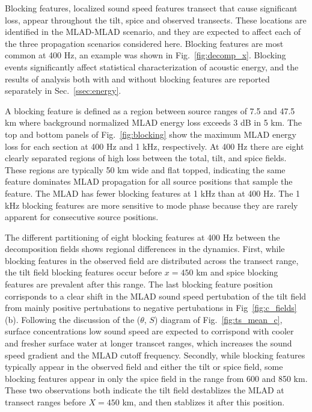 \documentclass[preprint,NumberedRefs]{JASA}
\begin{document}
Blocking features, localized sound speed features transect that cause significant loss, appear throughout the tilt, spice and observed transects. These locations are identified in the MLAD-MLAD scenario, and they are expected to affect each of the three propagation scenarios considered here. Blocking features are most common at 400 Hz, an example was shown in Fig.~\ref{fig:decomp_x}. Blocking events significantly affect statistical characterization of acoustic energy, and the results of analysis both with and without blocking features are reported separately in Sec.~\ref{ssec:energy}.

A blocking feature is defined as a region between source ranges of 7.5 and 47.5 km where background normalized MLAD energy loss exceeds 3 dB in 5 km. The top and bottom panels of Fig.~\ref{fig:blocking} show the maximum MLAD energy loss for each section at 400 Hz and 1 kHz, respectively. At 400 Hz there are eight clearly separated regions of high loss between the total, tilt, and spice fields. These regions are typically 50 km wide and flat topped, indicating the same feature dominates MLAD propagation for all source positions that sample the feature. The MLAD has fewer blocking features at 1 kHz than at 400 Hz. The 1 kHz blocking features are more sensitive to mode phase because they are rarely apparent for consecutive source positions.

The different partitioning of eight blocking features at 400 Hz between the decomposition fields shows regional differences in the dynamics. First, while blocking features in the observed field are distributed across the transect range, the tilt field blocking features occur before $x=450$ km and spice blocking features are prevalent after this range. The last blocking feature position corrisponds to a clear shift in the MLAD sound speed pertubation of the tilt field from mainly positive pertubations to negative pertubations in Fig~\ref{fig:c_fields}(b). Following the discussion of the ($\theta$, $S$) diagram of Fig.~\ref{fig:ts_mean_c}, surface concentrations low sound speed are expected to corrispond with cooler and fresher surface water at longer transcet ranges, which increases the sound speed gradient and the MLAD cutoff frequency. Secondly, while blocking features typically appear in the observed field and either the tilt or spice field, some blocking features appear in only the spice field in the range from 600 and 850 km. These two observations both indicate the tilt field destablizes the MLAD at transect ranges before $X=450$ km, and then stablizes it after this position.
\end{document}
